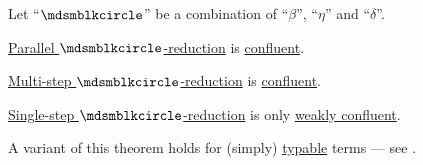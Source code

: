 \begin{theorem}\label{thm:church_rosser_theorem}
  Let \enquote{\( {\Anon} \)} be a combination of \enquote{\( \beta \)}, \enquote{\( \eta \)} and \enquote{\( \delta \)}.

  \begin{thmenum}
     \hyperref[def:parallel_reduction]{Parallel \( \Anon \)-reduction} is \hyperref[def:reduction_confluence]{confluent}.

     \hyperref[def:lambda_term_reduction/multi]{Multi-step \( \Anon \)-reduction} is \hyperref[def:reduction_confluence]{confluent}.

     \hyperref[def:lambda_term_reduction/single]{Single-step \( \Anon \)-reduction} is only \hyperref[def:reduction_confluence]{weakly confluent}.
  \end{thmenum}
\end{theorem}
\begin{comments}
  \item A variant of this theorem holds for (simply) \hyperref[def:typability]{typable} terms --- see .
\end{comments}

